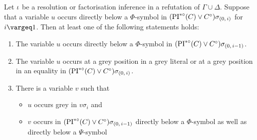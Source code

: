 \documentclass[,%
	draft=false,%
	numbers=noendperiod
	12pt,
	a4paper,
	oneside,%
	openany,
]{memoir}
\newcommand{\inv}{\ensuremath{\PIstarnosigma(C)\lor C\nosigma}}
\newcommand{\invp}{\ensuremath{(\inv)}}
\begin{document}
\begin{lemma}
	\label{lemma:var_below_phi_symbol}
	Let $\iota$ be a resolution or factorisation inference in a refutation of $\Gamma\cup\Delta$.
	Suppose that a variable $u$ occurs directly below a $\Phi$-symbol in $\invp\sigmazi$ for $i\vargeq 1$.
	Then at least one of the following statements holds:
	\begin{enumerate}
		\item
			\label{14_1}
			The variable $u$ occurs directly below a $\Phi$-symbol in $\invp\sigmazmi$.

		\item
			\label{14_5}
			The variable $u$ occurs at a grey position in a grey literal or at a grey position in an equality in $\invp\sigmazi$.

		\item 
			\label{14_2}
			There is a variable $v$ such that 
			{
				\renewcommand{\labelitemi}{\textendash}
				\begin{itemize}
					\item $u$ occurs grey in $v\sigma_i$ and
					\item $v$ occurs in $\invp\sigmazmi$ directly below a $\Phi$-symbol as well as directly below a $\Psi$-symbol
				\end{itemize}
			}

	\end{enumerate}
\end{lemma}
\end{document}
